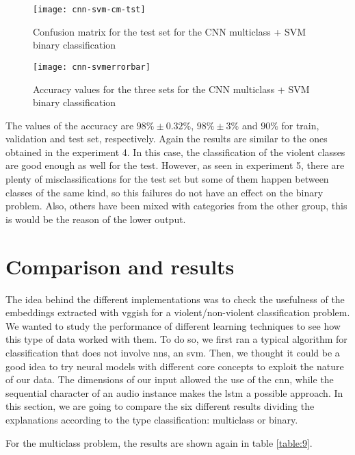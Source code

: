 	\begin{figure}[H]
		\centering
		\captionsetup{justification=centering}
		\texttt{[image: cnn-svm-cm-tst]}
		\caption{Confusion matrix for the test set for the CNN multiclass + SVM binary classification}
		\label{fig:mesh37}
	\end{figure}
	
	
	\begin{figure}[H]
		\centering
		\captionsetup{justification=centering}
		\texttt{[image: cnn-svmerrorbar]}
		\caption{Accuracy values for the three sets for the CNN multiclass + SVM binary classification}
		\label{fig:mesh38}
	\end{figure}

	The values of the accuracy are $98\% \pm 0.32\%$, $98\% \pm 3\%$ and $90\%$ for train, validation and test set, respectively. Again the results are similar to the ones obtained in the experiment 4. In this case, the classification of the violent classes are good enough as well for the test. However, as seen in experiment 5, there are plenty of misclassifications for the test set but some of them happen between classes of the same kind, so this failures do not have an effect on the binary problem. Also, others have been mixed with categories from the other group, this is would be the reason of the lower output. 
	
\section{Comparison and results}
	
	The idea behind the different implementations was to check the usefulness of the embeddings extracted with \acrshort{vgg}ish for a violent/non-violent classification problem. We wanted to study the performance of different learning techniques to see how this type of data worked with them. To do so, we first ran a typical algorithm for classification that does not involve \acrlong{nn}s, an \acrshort{svm}. Then, we thought it could be a good idea to try neural models with different core concepts to exploit the nature of our data. The dimensions of our input allowed the use of the \acrshort{cnn}, while the sequential character of an audio instance makes the \acrshort{lstm} a possible approach. In this section, we are going to compare the six different results dividing the explanations according to the type classification: multiclass or binary. 
	
	For the multiclass problem, the results are shown again in table \ref{table:9}.
	
